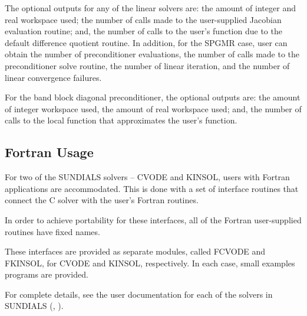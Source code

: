 The optional outputs for any of the linear solvers are: the amount of 
integer and real workspace used; the number of calls made to the user-supplied 
Jacobian evaluation routine; and, the number of calls to the user's function 
due to the default difference quotient routine.
In addition, for the SPGMR case, user can obtain the number of preconditioner
evaluations, the number of calls made to the preconditioner solve
routine, the number of linear iteration, and the number of linear
convergence failures.

For the band block diagonal preconditioner, the optional outputs are:
the amount of integer workspace used, the amount of real workspace
used; and, the number of calls to the local function that approximates
the user's function.

\subsection{Fortran Usage} \label{ss:Fortran_usage}

For two of the SUNDIALS solvers -- CVODE and KINSOL, users with
Fortran applications are accommodated.  This is done with a set of
interface routines that connect the C solver with the user's Fortran
routines.

In order to achieve portability for these interfaces, all of the
Fortran user-supplied routines have fixed names.

These interfaces are provided as separate modules, called FCVODE and
FKINSOL, for CVODE and KINSOL, respectively.  In each case, small
examples programs are provided.

For complete details, see the user documentation for each of the solvers 
in SUNDIALS (\cite{HiSe:03a}, \cite{HiSe:03c}).




